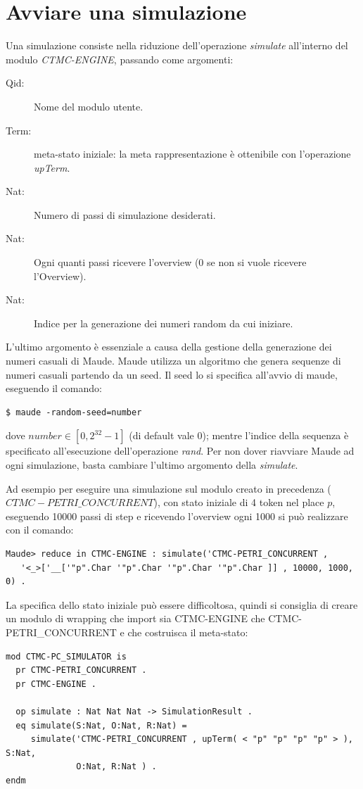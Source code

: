 \section{Avviare una simulazione}

Una simulazione consiste nella riduzione dell'operazione \emph{simulate}
all'interno del modulo \emph{CTMC-ENGINE}, passando come argomenti:
\begin{description}	
\item[Qid:] Nome del modulo utente.
\item[Term:] meta-stato iniziale: la meta rappresentazione è ottenibile con
l'operazione \emph{upTerm}.
\item[Nat:] Numero di passi di simulazione desiderati.
\item[Nat:] Ogni quanti passi ricevere l'overview (0 se non si vuole ricevere
l'Overview).
\item[Nat:] Indice per la generazione dei numeri random da cui iniziare.
\end{description}

L'ultimo argomento è essenziale a causa della gestione della generazione dei
numeri casuali di Maude. Maude utilizza un algoritmo che genera sequenze di
numeri casuali partendo da un seed. Il seed lo si specifica all'avvio di maude,
eseguendo il comando:
\begin{Verbatim}[fontsize=\small]
$ maude -random-seed=number
\end{Verbatim}
dove $number \in [0, 2^{32} - 1]$ (di default vale 0); mentre l'indice della
sequenza è specificato all'esecuzione dell'operazione \emph{rand}. Per non dover
riavviare Maude ad ogni simulazione, basta cambiare l'ultimo argomento della
\emph{simulate}.

Ad esempio per eseguire una simulazione sul modulo creato in precedenza
($CTMC-PETRI\_CONCURRENT$), con stato iniziale di 4 token nel place $p$,
eseguendo 10000 passi di step e ricevendo l'overview ogni 1000 si può realizzare con il
comando:
\begin{Verbatim}[fontsize=\small]
Maude> reduce in CTMC-ENGINE : simulate('CTMC-PETRI_CONCURRENT ,
   '<_>['__['"p".Char '"p".Char '"p".Char '"p".Char ]] , 10000, 1000, 0) . 
\end{Verbatim}
La specifica dello stato iniziale può essere difficoltosa, quindi si consiglia
di creare un modulo di wrapping che import sia CTMC-ENGINE che
CTMC-PETRI\_CONCURRENT e che costruisca il meta-stato:
\begin{Verbatim}[fontsize=\small]
mod CTMC-PC_SIMULATOR is
  pr CTMC-PETRI_CONCURRENT .
  pr CTMC-ENGINE .
  
  op simulate : Nat Nat Nat -> SimulationResult .
  eq simulate(S:Nat, O:Nat, R:Nat) =
     simulate('CTMC-PETRI_CONCURRENT , upTerm( < "p" "p" "p" "p" > ), S:Nat,
              O:Nat, R:Nat ) .  
endm
\end{Verbatim}

